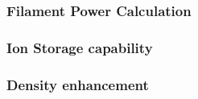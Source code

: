 		\subsubsection{Filament Power Calculation}
		
		\subsubsection{Ion Storage capability}
		
		
		\subsubsection{Density enhancement}
		
